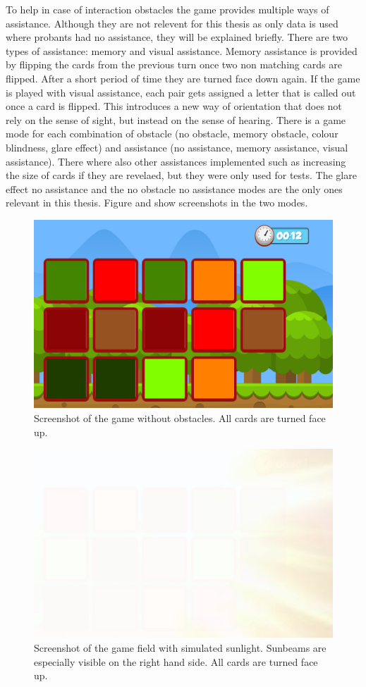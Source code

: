 To help in case of interaction obstacles the game provides multiple ways of assistance. Although they are not relevent for this thesis as only data is used where probants had no assistance, they will be explained briefly. There are two types of assistance: memory and visual assistance. Memory assistance is provided by flipping the cards from the previous turn once two non matching cards are flipped. After a short period of time they are turned face down again. If the game is played with visual assistance, each pair gets assigned a letter that is called out once a card is flipped. This introduces a new way of orientation that does not rely on the sense of sight, but instead on the sense of hearing. There is a game mode for each combination of obstacle (no obstacle, memory obstacle, colour blindness, glare effect) and assistance (no assistance, memory assistance, visual assistance). There where also other assistances implemented such as increasing the size of cards if they are revelaed, but they were only used for tests. The glare effect no assistance and the no obstacle no assistance modes are the only ones relevant in this thesis. Figure  and  show screenshots in the two modes. 

\begin{figure}[H]
	\centering
	\includegraphics[width=14cm]{images/noObstTurned.png}
	\caption[Bild kurz]{Screenshot of the game without obstacles. All cards are turned face up.}
	\label{fig:noObstacle}
\end{figure}

\begin{figure}[H]
	\centering
	\includegraphics[width=14cm]{images/glareEffect.png}
	\caption[Bild kurz]{Screenshot of the game field with simulated sunlight. Sunbeams are especially visible on the right hand side. All cards are turned face up.}
	\label{fig:glareEffect}
\end{figure}